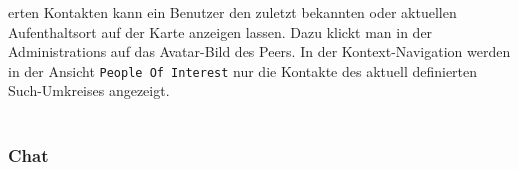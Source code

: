 erten Kontakten kann ein Benutzer den zuletzt bekannten oder aktuellen Aufenthaltsort auf der Karte anzeigen lassen. Dazu klickt man in der Administrations auf das Avatar-Bild des Peers. In der Kontext-Navigation werden in der Ansicht \texttt{People Of Interest} nur die Kontakte des aktuell definierten Such-Umkreises angezeigt.\\ \\


\subsubsection{Chat}

